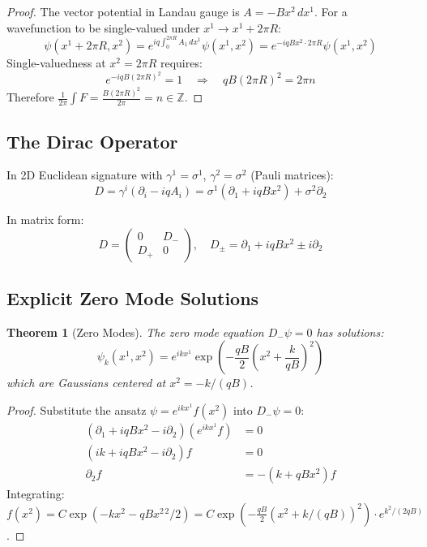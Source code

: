 \documentclass[12pt,a4paper]{article}
\newtheorem{theorem}{Theorem}[section]
\theoremstyle{definition}
\theoremstyle{remark}
\begin{document}
\begin{proof}
The vector potential in Landau gauge is $A = -Bx^2 \, dx^1$. For a wavefunction to be single-valued under $x^1 \to x^1 + 2\pi R$:
\begin{equation}
\psi(x^1 + 2\pi R, x^2) = e^{iq \int_0^{2\pi R} A_1 \, dx^1} \psi(x^1, x^2) = e^{-iqBx^2 \cdot 2\pi R} \psi(x^1, x^2)
\end{equation}
Single-valuedness at $x^2 = 2\pi R$ requires:
\begin{equation}
e^{-iqB(2\pi R)^2} = 1 \quad \Rightarrow \quad qB(2\pi R)^2 = 2\pi n
\end{equation}
Therefore $\frac{1}{2\pi} \int F = \frac{B(2\pi R)^2}{2\pi} = n \in \mathbb{Z}$.
\end{proof}

\subsection{The Dirac Operator}

In 2D Euclidean signature with $\gamma^1 = \sigma^1$, $\gamma^2 = \sigma^2$ (Pauli matrices):
\begin{equation}
D = \gamma^i(\partial_i - iqA_i) = \sigma^1(\partial_1 + iqBx^2) + \sigma^2 \partial_2
\end{equation}

In matrix form:
\begin{equation}
D = \begin{pmatrix} 0 & D_- \\ D_+ & 0 \end{pmatrix}, \quad
D_\pm = \partial_1 + iqBx^2 \pm i\partial_2
\end{equation}

\subsection{Explicit Zero Mode Solutions}

\begin{theorem}[Zero Modes]
The zero mode equation $D_- \psi = 0$ has solutions:
\begin{equation}
\psi_k(x^1, x^2) = e^{ikx^1} \exp\left(-\frac{qB}{2}\left(x^2 + \frac{k}{qB}\right)^2\right)
\end{equation}
which are Gaussians centered at $x^2 = -k/(qB)$.
\end{theorem}

\begin{proof}
Substitute the ansatz $\psi = e^{ikx^1} f(x^2)$ into $D_- \psi = 0$:
\begin{align}
(\partial_1 + iqBx^2 - i\partial_2)(e^{ikx^1} f) &= 0 \\
(ik + iqBx^2 - i\partial_2)f &= 0 \\
\partial_2 f &= -(k + qBx^2)f
\end{align}
Integrating: $f(x^2) = C \exp(-kx^2 - qBx^{2\,2}/2) = C \exp(-\frac{qB}{2}(x^2 + k/(qB))^2) \cdot e^{k^2/(2qB)}$.
\end{proof}
\end{document}
